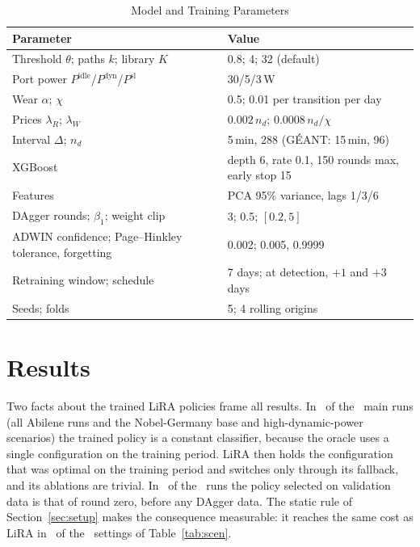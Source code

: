 \documentclass[journal]{IEEEtran}
\begin{document}
\begin{table}[t]
\centering
\caption{Model and Training Parameters}
\label{tab:params}
\footnotesize
\setlength{\tabcolsep}{3pt}
\begin{tabular}{@{}p{3.9cm}p{4.6cm}@{}}
\toprule
Parameter & Value \\
\midrule
Threshold $\theta$; paths $k$; library $K$ & 0.8; 4; 32 (default) \\
Port power $P^{\mathrm{idle}}$/$P^{\mathrm{dyn}}$/$P^{\mathrm{sl}}$ & 30/5/3\,W \\
Wear $\alpha$; $\chi$ & 0.5; 0.01 per transition per day \\
Prices $\lambda_R$; $\lambda_W$ & $0.002\,n_d$; $0.0008\,n_d/\chi$ \\
Interval $\Delta$; $n_d$ & 5\,min, 288 (G\'{E}ANT: 15\,min, 96) \\
XGBoost & depth 6, rate 0.1, 150 rounds max, early stop 15 \\
Features & PCA 95\% variance, lags 1/3/6 \\
DAgger rounds; $\beta_1$; weight clip & 3; 0.5; $[0.2,5]$ \\
ADWIN confidence; Page--Hinkley tolerance, forgetting & 0.002; 0.005, 0.9999 \\
Retraining window; schedule & 7 days; at detection, $+1$ and $+3$ days \\
Seeds; folds & 5; 4 rolling origins \\
\bottomrule
\end{tabular}
\end{table}

\section{Results}\label{sec:results}

Two facts about the trained LiRA policies frame all results. In \liraConstRuns\ of the \liraTotalRuns\ main runs (all Abilene runs and the Nobel-Germany base and high-dynamic-power scenarios) the trained policy is a constant classifier, because the oracle uses a single configuration on the training period. LiRA then holds the configuration that was optimal on the training period and switches only through its fallback, and its ablations are trivial. In \daggerRoundZero\ of the \daggerRuns\ runs the policy selected on validation data is that of round zero, before any DAgger data. The static rule of Section~\ref{sec:setup} makes the consequence measurable: it reaches the same cost as LiRA in \staticSame\ of the \staticTotal\ settings of Table~\ref{tab:scen}.
\end{document}
